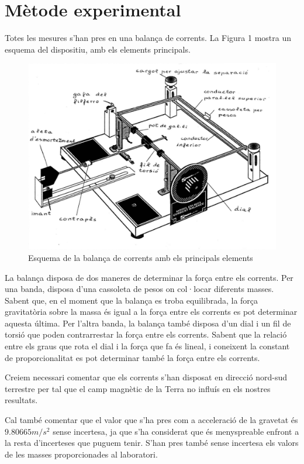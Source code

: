 \documentclass[a4paper,11pt]{article}
\begin{document}
\section{Mètode experimental}
Totes les mesures s'han pres en una balança de corrents. La Figura 1 mostra un esquema del dispositiu, amb els elements principals.
\begin{figure}
	\centering
	\includegraphics[scale=0.5]{Fig1.png}
	\caption{Esquema de la balança de corrents amb els principals elements}
\end{figure}

La balança disposa de dos maneres de determinar la força entre els corrents. Per una banda, disposa d'una cassoleta de pesos on col·locar diferents masses. Sabent que, en el moment que la balança es troba equilibrada, la força gravitatòria sobre la massa és igual a la força entre els corrents es pot determinar aquesta última. Per l'altra banda, la balança també disposa d'un dial i un fil de torsió que poden contrarrestar la força entre els corrents. Sabent que la relació entre els graus que rota el dial i la força que fa és lineal, i coneixent la constant de proporcionalitat es pot determinar també la força entre els corrents.

Creiem necessari comentar que els corrents s'han disposat en direcció nord-sud terrestre per tal que el camp magnètic de la Terra no influís en els nostres resultats.

Cal també comentar que el valor que s'ha pres com a acceleració de la gravetat és $9.80665 \si{m/s^2}$ sense incertesa, ja que s'ha considerat que és menyspreable enfront a la resta d'incerteses que puguem tenir. S'han pres també sense incertesa els valors de les masses proporcionades al laboratori.
\end{document}
